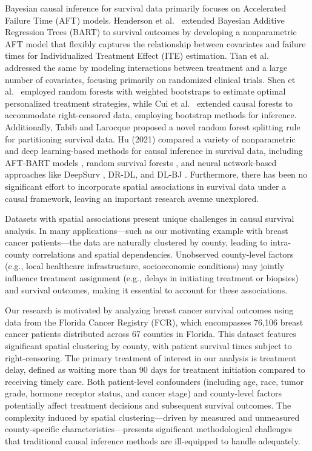 \documentclass[useAMS,referee]{biom}
\begin{document}
Bayesian causal inference for survival data primarily focuses on Accelerated Failure Time (AFT) models. Henderson et al.\ \parencite{henderson2017bayesian} extended Bayesian Additive Regression Trees (BART) to survival outcomes by developing a nonparametric AFT model that flexibly captures the relationship between covariates and failure times for Individualized Treatment Effect (ITE) estimation. Tian et al.\ \parencite{tian2014survival} addressed the same by modeling interactions between treatment and a large number of covariates, focusing primarily on randomized clinical trials. Shen et al.\ \parencite{shen2018personalized} employed random forests with weighted bootstraps to estimate optimal personalized treatment strategies, while Cui et al.\ \parencite{cui2017causal} extended causal forests \parencite{wager2018estimation} to accommodate right-censored data, employing bootstrap methods for inference. Additionally, Tabib and Larocque \parencite{tabib2018splitting} proposed a novel random forest splitting rule for partitioning survival data. Hu (2021)\parencite{hu2021estimating} compared a variety of nonparametric and deep learning-based methods for causal inference in survival data, including AFT-BART models \parencite{henderson2017bayesian}, random survival forests \parencite{Ishwaran08}, and neural network-based approaches like DeepSurv \parencite{katzman2018deep}, DR-DL, and DL-BJ \parencite{kvamme2019time, lee2020causal}. Furthermore, there has been no significant effort to incorporate spatial associations in survival data under a causal framework, leaving an important research avenue unexplored.

 

Datasets with spatial associations present unique challenges in causal survival analysis. In many applications—such as our motivating example with breast cancer patients—the data are naturally clustered by county, leading to intra-county correlations and spatial dependencies. Unobserved county-level factors (e.g., local healthcare infrastructure, socioeconomic conditions) may jointly influence treatment assignment (e.g., delays in initiating treatment or biopsies) and survival outcomes, making it essential to account for these associations.

Our research is motivated by analyzing breast cancer survival outcomes using data from the Florida Cancer Registry (FCR), which encompasses 76,106 breast cancer patients distributed across 67 counties in Florida. This dataset features significant spatial clustering by county, with patient survival times subject to right-censoring. The primary treatment of interest in our analysis is treatment delay, defined as waiting more than 90 days for treatment initiation compared to receiving timely care. Both patient-level confounders (including age, race, tumor grade, hormone receptor status, and cancer stage) and county-level factors potentially affect treatment decisions and subsequent survival outcomes. The complexity induced by spatial clustering—driven by measured and unmeasured county-specific characteristics—presents significant methodological challenges that traditional causal inference methods are ill-equipped to handle adequately.
\end{document}
